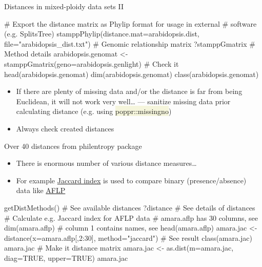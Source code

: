 \documentclass[compress, xelatex, 11pt, xcolor=svgnames, aspectratio=169,
	hyperref={
		bookmarks=true,
		unicode=true,
		colorlinks=true,
		pdftitle={Molecular data in R},
		plainpages=false,
		pdfauthor={Vojtech Zeisek},
		pdfsubject={Course about phylogeny and evolution in R},
		pdfcreator={XeLaTeX},
		pdfkeywords={R, evolution, phylogeny, molecular data},
		linkcolor=Crimson, %
		anchorcolor=Magenta, %
		citecolor=Magenta, %
		filecolor=Magenta, %
		menucolor=Magenta, %
		urlcolor=DodgerBlue, %
		},
	url={hyphens, lowtilde} %
	]{beamer}
\renewcommand{\texttt}[1]{\colorbox{Beige}{{\ttfamily #1}}}
\begin{document}
\begin{frame}[fragile]{Distances in mixed-ploidy data sets II}
	\begin{spluscode}
    # Export the distance matrix as Phylip format for usage in external
    # software (e.g. SplitsTree)
    stamppPhylip(distance.mat=arabidopsis.dist, file="arabidopsis_dist.txt")
    # Genomic relationship matrix
    ?stamppGmatrix # Method details
    arabidopsis.genomat <- stamppGmatrix(geno=arabidopsis.genlight)
    # Check it
    head(arabidopsis.genomat)
    dim(arabidopsis.genomat)
    class(arabidopsis.genomat)
	\end{spluscode}
	\begin{itemize}
		\item If there are plenty of missing data and/or the distance is far from being Euclidean, it will not work very well\ldots{ } --- sanitize missing data prior calculating distance (e.g. using \texttt{poppr::missingno})
		\item Always check created distances
	\end{itemize}
\end{frame}

\begin{frame}[fragile]{Over 40 distances from philentropy package}
	\begin{itemize}
		\item There is enormous number of various distance measures\ldots
		\item For example \href{https://en.wikipedia.org/wiki/Jaccard_index}{Jaccard index} is used to compare binary (presence/absence) data like \href{https://en.wikipedia.org/wiki/Amplified_fragment_length_polymorphism}{AFLP}
	\end{itemize}
	\begin{spluscode}
    getDistMethods() # See available distances
    ?distance # See details of distances
    # Calculate e.g. Jaccard index for AFLP data
    # amara.aflp has 30 columns, see dim(amara.aflp)
    # column 1 contains names, see head(amara.aflp)
    amara.jac <- distance(x=amara.aflp[,2:30], method="jaccard")
    # See result
    class(amara.jac)
    amara.jac
    # Make it distance matrix
    amara.jac <- as.dist(m=amara.jac, diag=TRUE, upper=TRUE)
    amara.jac
	\end{spluscode}
\end{frame}
\end{document}
